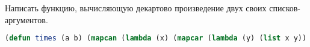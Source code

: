 Написать функцию, вычисляющую декартово произведение двух своих
списков-аргументов.

\begin{lstlisting}[language=Lisp]
(defun times (a b) (mapcan (lambda (x) (mapcar (lambda (y) (list x y)) b)) a))
\end{lstlisting}

